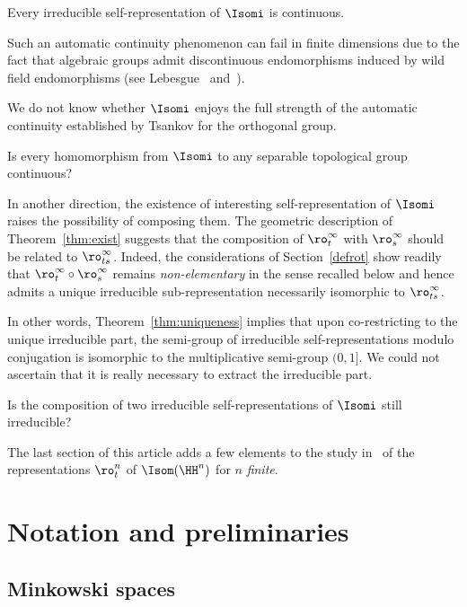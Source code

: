 \begin{imain}\label{thm:auto}
Every irreducible self-representation of $\Isomi$ is continuous.
\end{imain}

Such an automatic continuity phenomenon can fail in finite dimensions due to the fact that algebraic groups admit discontinuous endomorphisms induced by wild field endomorphisms (see Lebesgue~\cite[p.~533]{Lebesgue07} and~\cite{Kestelman51}).

We do not know whether $\Isomi$ enjoys the full strength of the automatic continuity established by Tsankov for the orthogonal group.

\begin{iprob*}
Is every homomorphism from $\Isomi$ to any separable topological group continuous?
\end{iprob*}

In another direction, the existence of interesting self-representation of $\Isomi$ raises the possibility of composing them. The geometric description of Theorem~\ref{thm:exist} suggests that the composition of $\ro^\infty_t$ with $\ro^\infty_s$ should be related to $\ro^\infty_{ts}$. Indeed, the considerations of Section~\ref{defrot} show readily that $\ro^\infty_t\circ \ro^\infty_s$ remains \emph{non-elementary} in the sense recalled below and hence admits a unique irreducible sub-representation necessarily isomorphic to $\ro^\infty_{ts}$.

In other words, Theorem~\ref{thm:uniqueness} implies that upon co-restricting to the unique irreducible part, the semi-group of irreducible self-representations modulo conjugation is isomorphic to the multiplicative semi-group $(0,1]$. We could not ascertain that it is really necessary to extract the irreducible part.

\begin{iprob*}
Is the composition of two irreducible self-representations of $\Isomi$ still irreducible?
\end{iprob*}

The last section of this article adds a few elements to the study in~\cite{Monod-Py} of the representations $\ro^n_t$ of $\Isom(\HH^n)$ for $n$ \emph{finite}.


\section{Notation and preliminaries}\label{sec:prelim}

\subsection{Minkowski spaces}\label{sec:Minkowski}

